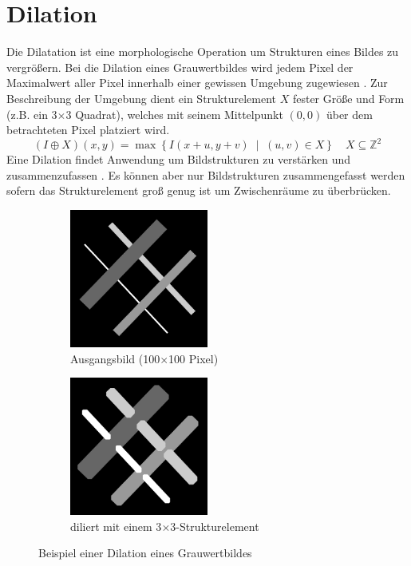 \section{Dilation}
\writtenby{\dcauthornameewie}%
Die Dilatation ist eine morphologische Operation um Strukturen eines Bildes zu vergrößern.
Bei die Dilation eines Grauwertbildes wird jedem Pixel der Maximalwert aller Pixel innerhalb einer gewissen Umgebung zugewiesen \cite[3.5]{steinmueller2008}.
Zur Beschreibung der Umgebung dient ein Strukturelement $X$ fester Größe und Form (z.B. ein 3$\times$3 Quadrat), welches mit seinem Mittelpunkt $(0,0)$ über dem betrachteten Pixel platziert wird.
  \[ (I\oplus X)(x,y)= \max \left\{ I(x+u,y+v) \;\middle|\; (u,v) \in X \right\} \quad X \subseteq \mathbb{Z}^2 \]
Eine Dilation findet Anwendung um Bildstrukturen zu verstärken und zusammenzufassen \cite[3.1]{steinmueller2008}.
Es können aber nur Bildstrukturen zusammengefasst werden sofern das Strukturelement groß genug ist um Zwischenräume zu überbrücken.

\begin{figure}[H]
  \label{fig:dilation}
  \centering
  \begin{subfigure}{0.49\linewidth}
    \centering
    \includegraphics[width=0.5\textwidth]{img/basics/dilation/before}
    \caption{Ausgangsbild (100$\times$100 Pixel)}
  \end{subfigure}
  \begin{subfigure}{0.49\linewidth}
    \centering
    \includegraphics[width=0.5\textwidth]{img/basics/dilation/after}
    \caption{diliert mit einem 3$\times$3-Strukturelement}
  \end{subfigure}
  \caption{Beispiel einer Dilation eines Grauwertbildes}
\end{figure}
